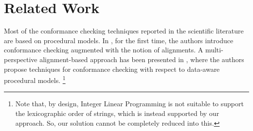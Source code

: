 \section{Related Work}
\label{sec:related}

Most of the conformance checking techniques reported in the scientific literature are based on procedural models. In \cite{DBLP:conf/edoc/AdriansyahDA11}, for the first time, the authors introduce conformance checking augmented with the notion of alignments.
A multi-perspective alignment-based approach has been presented in \cite{MultiPerspective}, where the authors propose techniques for conformance checking with respect to data-aware procedural models. 
\footnote{Note that, by design, Integer Linear Programming is not suitable to support the lexicographic order of strings, which is instead supported by our approach. So, our solution cannot be completely reduced into this.}
\\
\indent
